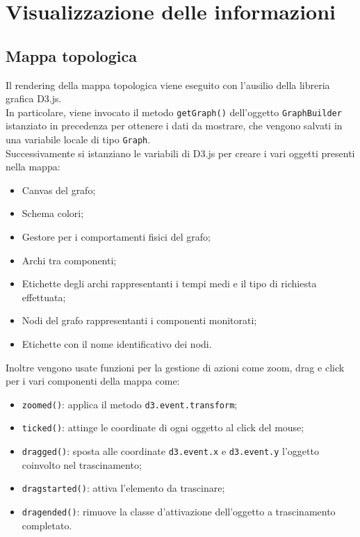 \section{Visualizzazione delle informazioni}
\label{sec:visInfo}

\subsection{Mappa topologica}
Il rendering della mappa topologica viene eseguito con l'ausilio della libreria grafica D3.js. \\
In particolare, viene invocato il metodo \texttt{getGraph()} dell'oggetto \texttt{GraphBuilder} istanziato in precedenza per ottenere i dati da mostrare, che vengono salvati in una variabile locale di tipo \texttt{Graph}. \\
Successivamente si istanziano le variabili di D3.js per creare i vari oggetti presenti nella mappa:
\begin{itemize}
	\item Canvas del grafo;
	\item Schema colori;
	\item Gestore per i comportamenti fisici del grafo;
	\item Archi tra componenti;
	\item Etichette degli archi rappresentanti i tempi medi e il tipo di richiesta effettuata;
	\item Nodi del grafo rappresentanti i componenti monitorati;
	\item Etichette con il nome identificativo dei nodi.
\end{itemize}
Inoltre vengono usate funzioni per la gestione di azioni come zoom, drag e click per i vari componenti della mappa come:
\begin{itemize}
	\item \texttt{zoomed()}: applica il metodo \texttt{d3.event.transform};
	\item \texttt{ticked()}: attinge le coordinate di ogni oggetto al click del mouse;
	\item \texttt{dragged()}: sposta alle coordinate \texttt{d3.event.x} e \texttt{d3.event.y} l'oggetto coinvolto nel trascinamento;
	\item \texttt{dragstarted()}: attiva l'elemento da trascinare;
	\item \texttt{dragended()}: rimuove la classe d'attivazione dell'oggetto a trascinamento completato.
\end{itemize}

